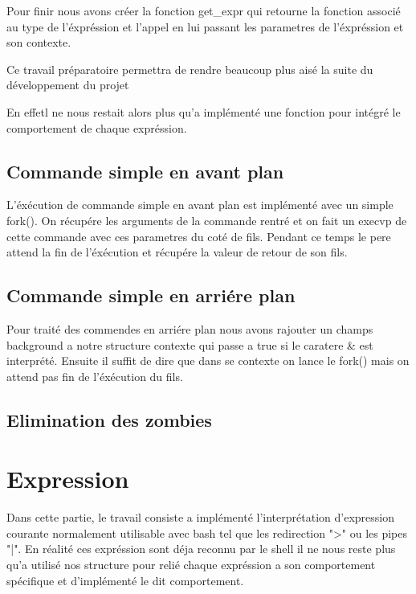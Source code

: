 \documentclass[12pt]{article}
\begin{document}
 Pour finir nous avons créer la fonction get\_expr qui retourne la fonction associé au 
 type de l'éxpréssion et l'appel en lui passant les parametres de l'éxpréssion et son 
 contexte.
 
 Ce travail préparatoire permettra de rendre beaucoup plus aisé la suite du développement
 du projet
 
 En effetl ne nous restait alors plus qu'a implémenté une fonction pour intégré le comportement
 de chaque expréssion.
 
 \subsection{Commande simple en avant plan}
 
 L'éxécution de commande simple en avant plan est implémenté avec un simple fork().
 On récupére les arguments de la commande rentré et on fait un execvp de cette commande
 avec ces parametres du coté de fils. Pendant ce temps le pere attend la fin de l'éxécution
 et récupére la valeur de retour de son fils.
 
 \subsection{Commande simple en arriére plan}
 
 Pour traité des commendes en arriére plan nous avons rajouter un champs background
 a notre structure contexte qui passe a true si le caratere \& est interprété.
 Ensuite il suffit de dire que dans se contexte on lance le fork() mais on attend pas
 fin de l'éxécution du fils.
 
 
 \subsection{Elimination des zombies}
 
 
 

\newpage
\section{Expression}

Dans cette partie, le travail consiste a implémenté l'interprétation d'expression courante
normalement utilisable avec bash tel que les redirection ">" ou les pipes "|".
En réalité ces expréssion sont déja reconnu par le shell il ne nous reste plus qu'a utilisé
nos structure pour relié chaque expréssion a son comportement spécifique et d'implémenté le
dit comportement.
\end{document}
